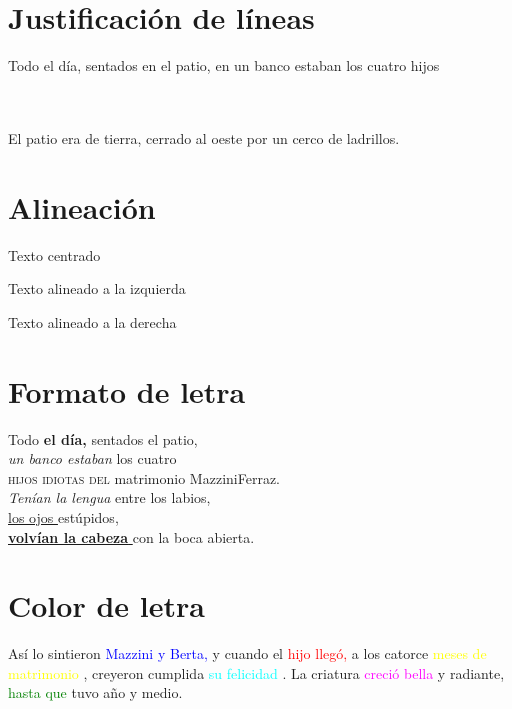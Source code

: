 \documentclass[12pt,latterpaper]{article}
\begin{document}
\section{Justificación de líneas}

Todo el día, sentados en el patio, en un banco estaban los cuatro
hijos \\
\\

\\

\centerline{El patio era de tierra, cerrado al oeste por un cerco de
ladrillos.}



\section{Alineación}

\begin {center}
Texto centrado
\end {center}

\begin {flushleft}
Texto alineado a la izquierda
\end {flushleft}

\begin {flushright}
Texto alineado a la derecha
\end {flushright}


\section{Formato de letra}

Todo \textbf{el día, } sentados el patio,\\
\textit{un banco estaban } los cuatro\\
\textsc{hijos idiotas del} matrimonio MazziniFerraz.\\
\textsl{Tenían la lengua} entre los labios,\\
\underline{los ojos } estúpidos,\\
\underline { \textbf {volvían la cabeza }} con la boca abierta.

\section{Color de letra}

Así lo sintieron \textcolor{blue}{Mazzini y Berta,} y cuando el
\textcolor{red}{hijo llegó,} a los catorce
\textcolor{yellow}{meses de matrimonio} , creyeron cumplida \textcolor{cyan}{su felicidad} .
La criatura \textcolor{magenta}{creció bella } y radiante, \textcolor{green}{hasta que} tuvo año y medio.
\end{document}
